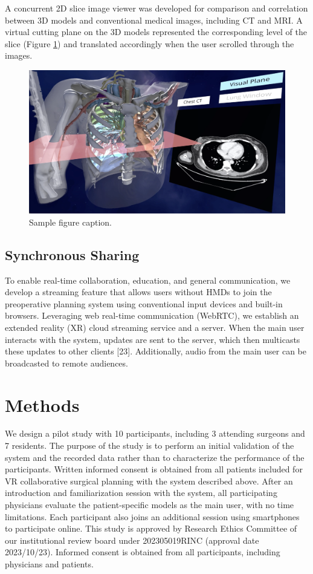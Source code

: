 \documentclass{bmcart}
\begin{document}
A concurrent 2D slice image viewer was developed for comparison and correlation between 3D models and conventional medical images, including CT and MRI. A virtual cutting plane on the 3D models represented the corresponding level of the slice (Figure \ref{fig:CuttingPlane}) and translated accordingly when the user scrolled through the images.
\begin{figure}
  \centering
  \includegraphics[width=.9\linewidth]{../Media/CuttingPlane.png}  
  \caption{Sample figure caption.}
  \label{fig:CuttingPlane}
\end{figure}
\subsection{Synchronous Sharing}
To enable real-time collaboration, education, and general communication, we develop a streaming feature that allows users without HMDs to join the preoperative planning system using conventional input devices and built-in browsers. Leveraging web real-time communication (WebRTC), we establish an extended reality (XR) cloud streaming service and a server. When the main user interacts with the system, updates are sent to the server, which then multicasts these updates to other clients [23]. Additionally, audio from the main user can be broadcasted to remote audiences.
\section{Methods}
We design a pilot study with 10 participants, including 3 attending surgeons and 7 residents. The purpose of the study is to perform an initial validation of the system and the recorded data rather than to characterize the performance of the participants. Written informed consent is obtained from all patients included for VR collaborative surgical planning with the system described above. After an introduction and familiarization session with the system, all participating physicians evaluate the patient-specific models as the main user, with no time limitations. Each participant also joins an additional session using smartphones to participate online. This study is approved by Research Ethics Committee of our institutional review board under 202305019RINC (approval date 2023/10/23). Informed consent is obtained from all participants, including physicians and patients.
\end{document}

